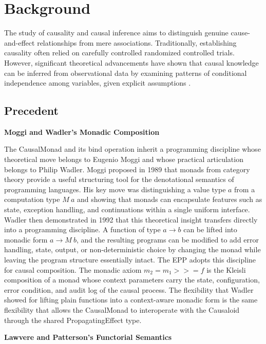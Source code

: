 \section{Background}
\label{sec:related_work}

The study of causality and causal inference aims to distinguish genuine cause-and-effect relationships from mere associations. Traditionally, establishing causality often relied on carefully controlled randomized controlled trials. However, significant theoretical advancements have shown that causal knowledge can be inferred from observational data by examining patterns of conditional independence among variables, given explicit assumptions \cite{pearl2018theoretical}.


\subsection{Precedent}


\textbf{Moggi and Wadler's Monadic Composition}

The CausalMonad and its bind operation inherit a programming discipline whose theoretical move belongs to Eugenio Moggi and whose practical articulation belongs to Philip Wadler. Moggi proposed in 1989 that monads from category theory provide a useful structuring tool for the denotational semantics of programming languages\cite{moggi1989computational}. His key move was distinguishing a value type $a$ from a computation type $M\ a$ and showing that monads can encapsulate features such as state, exception handling, and continuations within a single uniform interface. Wadler then demonstrated in 1992 that this theoretical insight transfers directly into a programming discipline\cite{wadler1992essence}. A function of type $a \to b$ can be lifted into monadic form $a \to M\ b$, and the resulting programs can be modified to add error handling, state, output, or non-deterministic choice by changing the monad while leaving the program structure essentially intact. The EPP adopts this discipline for causal composition. The monadic axiom $m_2 = m_1 \mathbin{>\!\!>\!\!=} f$ is the Kleisli composition of a monad whose context parameters carry the state, configuration, error condition, and audit log of the causal process. The flexibility that Wadler showed for lifting plain functions into a context-aware monadic form is the same flexibility that allows the CausalMonad to interoperate with the Causaloid through the shared PropagatingEffect type.


\textbf{Lawvere and Patterson's Functorial Semantics}

